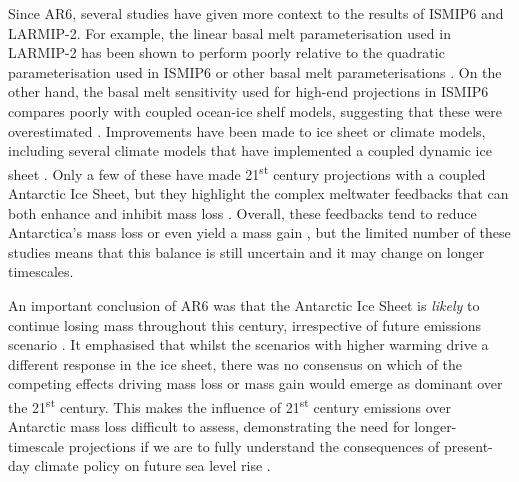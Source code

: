 Since AR6, several studies have given more context to the results of ISMIP6 and LARMIP-2. For example, the linear basal melt parameterisation used in LARMIP-2 has been shown to perform poorly relative to the quadratic parameterisation used in ISMIP6 or other basal melt parameterisations \citep{burgardAssessmentBasalMelt2022}. On the other hand, the basal melt sensitivity used for high-end projections in ISMIP6 compares poorly with coupled ocean-ice shelf models, suggesting that these were overestimated \citep{jourdainTwentyfirstCenturyProjections2022}. Improvements have been made to ice sheet or climate models, including several climate models that have implemented a coupled dynamic ice sheet \citep{muntjewerfDescriptionDemonstrationCoupled2021,siahaanAntarcticContribution21stcentury2022,parkFutureSealevelProjections2023,goelzerInteractiveCouplingGreenland2025,sadaiAntarcticMeltwaterAlters2025}. Only a few of these have made 21\textsuperscript{st} century projections with a coupled Antarctic Ice Sheet, but they highlight the complex meltwater feedbacks that can both enhance and inhibit mass loss \citep{parkFutureSealevelProjections2023}. Overall, these feedbacks tend to reduce Antarctica's mass loss \citep{parkFutureSealevelProjections2023,sadaiAntarcticMeltwaterAlters2025} or even yield a mass gain \citep{siahaanAntarcticContribution21stcentury2022}, but the limited number of these studies means that this balance is still uncertain and it may change on longer timescales.

An important conclusion of AR6 was that the Antarctic Ice Sheet is \textit{likely} to continue losing mass throughout this century, irrespective of future emissions scenario \citep{fox-kemperOceanCryosphereSea2021}. It emphasised that whilst the scenarios with higher warming drive a different response in the ice sheet, there was no consensus on which of the competing effects driving mass loss or mass gain would emerge as dominant over the 21\textsuperscript{st} century. This makes the influence of 21\textsuperscript{st} century emissions over Antarctic mass loss difficult to assess, demonstrating the need for longer-timescale projections if we are to fully understand the consequences of present-day climate policy on future sea level rise \citep{lowryInfluenceEmissionsScenarios2021}.


